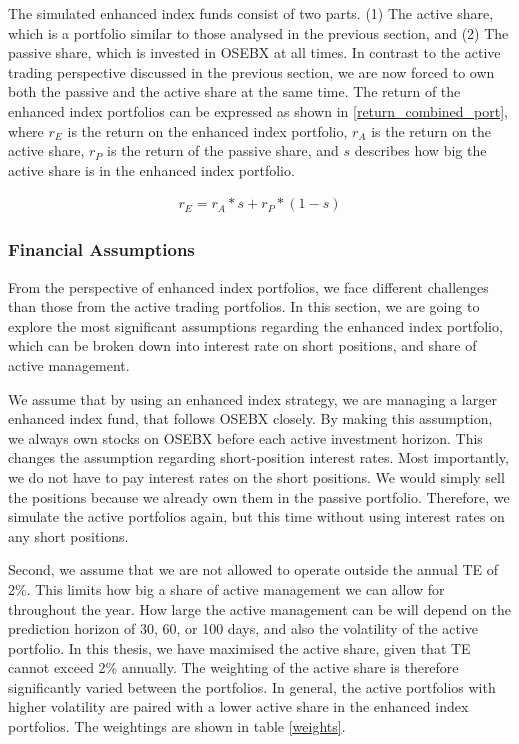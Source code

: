 The simulated enhanced index funds consist of two parts. (1) The active share, which is a portfolio similar to those analysed in the previous section, and (2) The passive share, which is invested in OSEBX at all times. In contrast to the active trading perspective discussed in the previous section, we are now forced to own both the passive and the active share at the same time. The return of the enhanced index portfolios can be expressed as shown in \autoref{return_combined_port}, where $r_E$ is the return on the enhanced index portfolio, $r_A$ is the return on the active share, $r_P$ is the return of the passive share, and $s$ describes how big the active share is in the enhanced index portfolio. 

\begin{equation}
\begin{aligned}
    r_E =  r_A*s + r_P * (1-s)
\label{return_combined_port}
\end{aligned}
\end{equation}

\subsubsection{Financial Assumptions}

From the perspective of enhanced index portfolios, we face different challenges than those from the active trading portfolios. In this section, we are going to explore the most significant assumptions regarding the enhanced index portfolio, which can be broken down into interest rate on short positions, and share of active management.

We assume that by using an enhanced index strategy, we are managing a larger enhanced index fund, that follows OSEBX closely. By making this assumption, we always own stocks on OSEBX before each active investment horizon. This changes the assumption regarding short-position interest rates. Most importantly, we do not have to pay interest rates on the short positions. We would simply sell the positions because we already own them in the passive portfolio. Therefore, we simulate the active portfolios again, but this time without using interest rates on any short positions. 

Second, we assume that we are not allowed to operate outside the annual TE of 2\%. This limits how big a share of active management we can allow for throughout the year. How large the active management can be will depend on the prediction horizon of 30, 60, or 100 days, and also the volatility of the active portfolio. In this thesis, we have maximised the active share, given that TE cannot exceed 2\% annually. The weighting of the active share is therefore significantly varied between the portfolios. In general, the active portfolios with higher volatility are paired with a lower active share in the enhanced index portfolios. The weightings are shown in table \autoref{weights}. 

